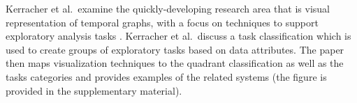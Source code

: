 



Kerracher et al.\ examine the quickly-developing research area that is visual representation of temporal graphs, with a focus on techniques to support exploratory analysis tasks \cite{kerracher2015visual}.
Kerracher et al.\ discuss a task classification which is used to create groups of exploratory tasks based on data attributes. The paper then maps visualization techniques to the quadrant classification as well as the tasks categories and provides examples of the related systems (the figure is provided in the supplementary material).



